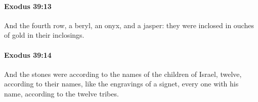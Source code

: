 		\paragraph{Exodus 39:13} %
			\label{EXODUS-39-13}

			And the fourth row, a beryl, an onyx, and a jasper: they were inclosed in ouches of gold in their inclosings.


		\paragraph{Exodus 39:14} %
			\label{EXODUS-39-14}

			And the stones were according to the names of the children of Israel, twelve, according to their names, like the engravings of a signet, every one with his name, according to the twelve tribes.



